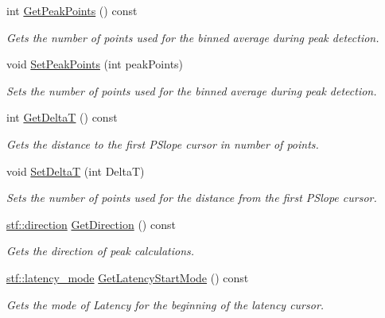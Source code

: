 \begin{DoxyCompactItemize}
int \hyperlink{classwxStfCursorsDlg_aed1c8d75410af56a4dfba76dae6e2ecc}{GetPeakPoints} () const 
\begin{DoxyCompactList}\small\item\em Gets the number of points used for the binned average during peak detection. \item\end{DoxyCompactList}\item 
void \hyperlink{classwxStfCursorsDlg_a10fdc48de32be164e70eaf49d43c724f}{SetPeakPoints} (int peakPoints)
\begin{DoxyCompactList}\small\item\em Sets the number of points used for the binned average during peak detection. \item\end{DoxyCompactList}\item 
int \hyperlink{classwxStfCursorsDlg_a45576f19bb75432ede2a5743efc38c55}{GetDeltaT} () const 
\begin{DoxyCompactList}\small\item\em Gets the distance to the first PSlope cursor in number of points. \item\end{DoxyCompactList}\item 
void \hyperlink{classwxStfCursorsDlg_a1691b68e582e2bf940f04fd59c2da654}{SetDeltaT} (int DeltaT)
\begin{DoxyCompactList}\small\item\em Sets the number of points used for the distance from the first PSlope cursor. \item\end{DoxyCompactList}\item 
\hyperlink{group__stfgen_gae8845ae2aeaf4b742a905a2a5571fd5a}{stf::direction} \hyperlink{classwxStfCursorsDlg_aebe08375891c206922c3fb9482593964}{GetDirection} () const 
\begin{DoxyCompactList}\small\item\em Gets the direction of peak calculations. \item\end{DoxyCompactList}\item 
\hyperlink{group__stfgen_ga738f9934a45a9d2d81cb0a3de0375c99}{stf::latency\_\-mode} \hyperlink{classwxStfCursorsDlg_ae5c3f8ba6105aaee9f3d4961ba66b962}{GetLatencyStartMode} () const 
\begin{DoxyCompactList}\small\item\em Gets the mode of Latency for the beginning of the latency cursor. \item\end{DoxyCompactList}\item 

\end{DoxyCompactItemize}

